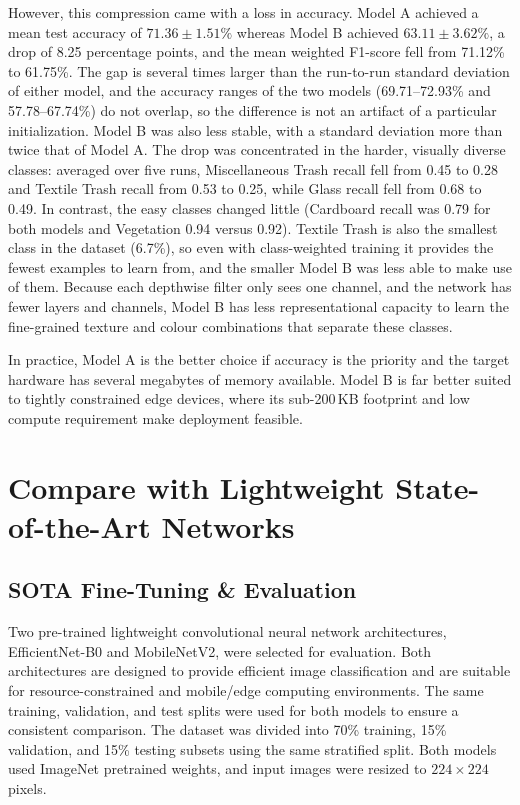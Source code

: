 \documentclass[12pt,a4paper]{article}
\begin{document}
However, this compression came with a loss in accuracy. Model A achieved
a mean test accuracy of $71.36\pm1.51\%$ whereas Model B achieved
$63.11\pm3.62\%$, a drop of 8.25 percentage points, and the mean weighted
F1-score fell from 71.12\% to 61.75\%. The gap is several times larger
than the run-to-run standard deviation of either model, and the
accuracy ranges of the two models (69.71--72.93\% and 57.78--67.74\%) do
not overlap, so the difference is not an artifact of a particular
initialization. Model B was also less stable, with a standard deviation
more than twice that of Model A. The drop was concentrated in the harder,
visually diverse classes: averaged over five runs, Miscellaneous Trash
recall fell from 0.45 to 0.28 and Textile Trash recall from 0.53 to
0.25, while Glass recall fell from 0.68 to 0.49. In contrast, the easy
classes changed little (Cardboard recall was 0.79 for both models and
Vegetation 0.94 versus 0.92). Textile Trash is also the smallest class
in the dataset (6.7\%), so even with class-weighted training it provides
the fewest examples to learn from, and the smaller Model B was less able
to make use of them. Because each depthwise filter only
sees one channel, and the network has fewer layers and channels, Model B
has less representational capacity to learn the fine-grained texture and
colour combinations that separate these classes.

In practice, Model A is the better choice if accuracy is the priority and
the target hardware has several megabytes of memory available. Model B is
far better suited to tightly constrained edge devices, where its sub-200\,KB footprint and low compute
requirement make deployment feasible.


\newpage
\section{Compare with Lightweight State-of-the-Art Networks}

\subsection{SOTA Fine-Tuning \& Evaluation}

Two pre-trained lightweight convolutional neural network architectures,
EfficientNet-B0 and MobileNetV2, were selected for evaluation. Both
architectures are designed to provide efficient image classification and
are suitable for resource-constrained and mobile/edge computing
environments. The same training, validation, and test splits were used
for both models to ensure a consistent comparison. The dataset was
divided into 70\% training, 15\% validation, and 15\% testing subsets
using the same stratified split. Both models used ImageNet pretrained
weights, and input images were resized to $224\times224$ pixels.
\end{document}
